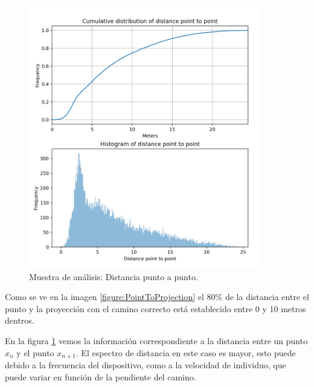 \begin{figure}[!htb]
\begin{minipage}{0.48\textwidth}
\includegraphics[width=0.9\textwidth]{./Imagenes/PointToPoint.png}
\caption{Muestra de análisis: Distancia punto a punto.}
\label{figure:PointToPoint}
\end{minipage}
\end{figure}
Como se ve en la imagen \ref{figure:PointToProjection} el 80\% de la distancia entre el punto y la 
proyección con el camino correcto está establecido entre 0 y 10 metros dentros.

En la figura \ref{figure:PointToPoint} vemos la información correspondiente a la distancia 
entre un punto $x_{n}$ y el punto $x_{n+1}$. El espectro de distancia en este caso es mayor, 
esto puede debido a la frecuencia del dispositivo, como a la velocidad de individuo, que puede 
variar en función de la pendiente del camino.